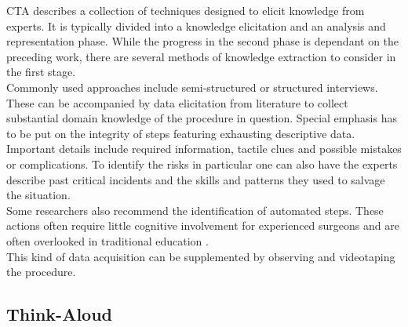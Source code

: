 CTA describes a collection of techniques designed to elicit knowledge from experts. It is typically divided into a knowledge elicitation and an analysis and representation phase. While the progress in the second phase is dependant on the preceding work, there are several methods of knowledge extraction to consider in the first stage\parencite{craig_using_2012}\parencite{cannon-bowers_using_2013}.\\
Commonly used approaches include semi-structured or structured interviews. These can be accompanied by data elicitation from literature to collect substantial domain knowledge of the procedure in question. Special emphasis has to be put on the integrity of steps featuring exhausting descriptive data\parencite{craig_using_2012}.
Important details include required information, tactile clues and possible mistakes or complications. 
To identify the risks in particular one can also have the experts describe past critical incidents and the skills and patterns they used to salvage the situation\parencite{cannon-bowers_using_2013}. \\
Some researchers also recommend the identification of automated steps. These actions often require little cognitive involvement for experienced surgeons and are often overlooked in traditional education \parencite{tjiam_designing_2012}. \\
This kind of data acquisition can be supplemented by observing and videotaping the procedure\parencite{johnson_development_2011}. 

\subsection{Think-Aloud}

